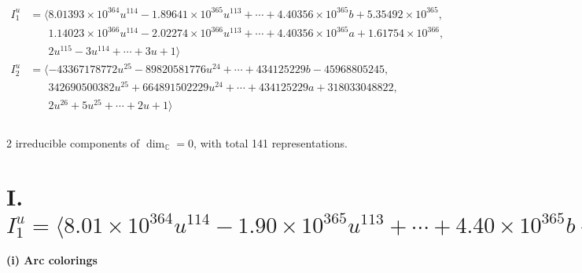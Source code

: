 \documentclass[1p]{elsarticle_modified}
\theoremstyle{definition}
\begin{document}
\begin{align*}
I^u_{1}&=\langle 
8.01393\times10^{364} u^{114}-1.89641\times10^{365} u^{113}+\cdots+4.40356\times10^{365} b+5.35492\times10^{365},\\
\phantom{I^u_{1}}&\phantom{= \langle  }1.14023\times10^{366} u^{114}-2.02274\times10^{366} u^{113}+\cdots+4.40356\times10^{365} a+1.61754\times10^{366},\\
\phantom{I^u_{1}}&\phantom{= \langle  }2 u^{115}-3 u^{114}+\cdots+3 u+1\rangle \\
I^u_{2}&=\langle 
-43367178772 u^{25}-89820581776 u^{24}+\cdots+434125229 b-45968805245,\\
\phantom{I^u_{2}}&\phantom{= \langle  }342690500382 u^{25}+664891502229 u^{24}+\cdots+434125229 a+318033048822,\\
\phantom{I^u_{2}}&\phantom{= \langle  }2 u^{26}+5 u^{25}+\cdots+2 u+1\rangle \\
\\
\end{align*}
\raggedright * 2 irreducible components of $\dim_{\mathbb{C}}=0$, with total 141 representations.\\
\newpage
\renewcommand{\arraystretch}{1}
\centering \section*{I. $I^u_{1}= \langle 8.01\times10^{364} u^{114}-1.90\times10^{365} u^{113}+\cdots+4.40\times10^{365} b+5.35\times10^{365},\;1.14\times10^{366} u^{114}-2.02\times10^{366} u^{113}+\cdots+4.40\times10^{365} a+1.62\times10^{366},\;2 u^{115}-3 u^{114}+\cdots+3 u+1 \rangle$}
\flushleft \textbf{(i) Arc colorings}\\
\end{document}
